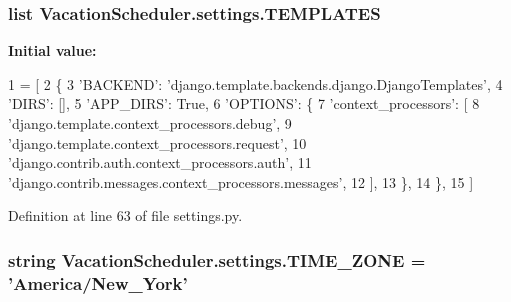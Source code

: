 \hypertarget{namespaceVacationScheduler_1_1settings_a94a6de58cd85b4097a8e8aaa23e46015}{
\subsubsection[{T\-E\-M\-P\-L\-A\-T\-E\-S}]{\setlength{\rightskip}{0pt plus 5cm}list Vacation\-Scheduler.\-settings.\-T\-E\-M\-P\-L\-A\-T\-E\-S}}\label{namespaceVacationScheduler_1_1settings_a94a6de58cd85b4097a8e8aaa23e46015}
{\bfseries Initial value\-:}
\begin{DoxyCode}
1 = [
2     \{
3         \textcolor{stringliteral}{'BACKEND'}: \textcolor{stringliteral}{'django.template.backends.django.DjangoTemplates'},
4         \textcolor{stringliteral}{'DIRS'}: [],
5         \textcolor{stringliteral}{'APP\_DIRS'}: \textcolor{keyword}{True},
6         \textcolor{stringliteral}{'OPTIONS'}: \{
7             \textcolor{stringliteral}{'context\_processors'}: [
8                 \textcolor{stringliteral}{'django.template.context\_processors.debug'},
9                 \textcolor{stringliteral}{'django.template.context\_processors.request'},
10                 \textcolor{stringliteral}{'django.contrib.auth.context\_processors.auth'},
11                 \textcolor{stringliteral}{'django.contrib.messages.context\_processors.messages'},
12             ],
13         \},
14     \},
15 ]
\end{DoxyCode}


Definition at line 63 of file settings.\-py.

\hypertarget{namespaceVacationScheduler_1_1settings_ad317c9bbe561a5d66045bc072cdf724d}{
\subsubsection[{T\-I\-M\-E\-\_\-\-Z\-O\-N\-E}]{\setlength{\rightskip}{0pt plus 5cm}string Vacation\-Scheduler.\-settings.\-T\-I\-M\-E\-\_\-\-Z\-O\-N\-E = 'America/New\-\_\-\-York'}}\label{namespaceVacationScheduler_1_1settings_ad317c9bbe561a5d66045bc072cdf724d}


